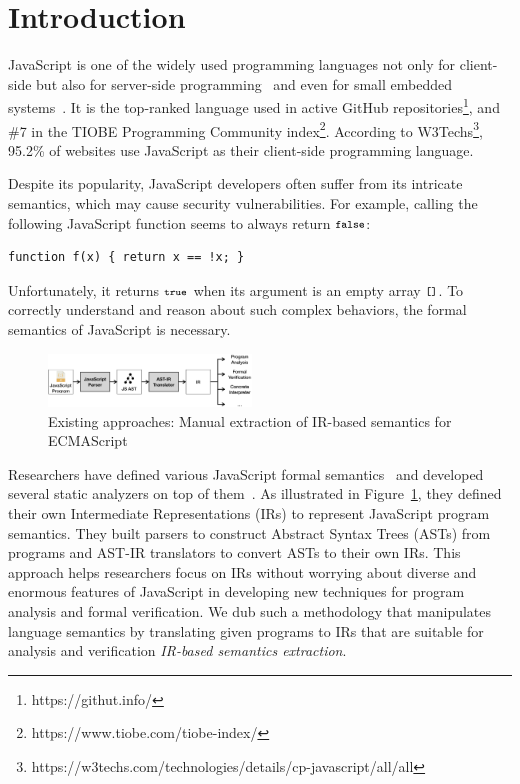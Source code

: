 \section{Introduction}
JavaScript is one of the widely used programming languages not only for client-side
but also for server-side programming~\cite{nodejs, meanjs}
and even for small embedded systems~\cite{espruino, tessel2}.
It is the top-ranked language used in active GitHub
repositories\footnote{https://githut.info/}, and \#7 in the TIOBE
Programming Community index\footnote{https://www.tiobe.com/tiobe-index/}.
According to W3Techs\footnote{https://w3techs.com/technologies/details/cp-javascript/all/all},
95.2\% of websites use JavaScript as their client-side programming language.

Despite its popularity, JavaScript developers often suffer from its intricate semantics,
which may cause security vulnerabilities.  For example, calling the following JavaScript
function seems to always return \( \texttt{\footnotesize false} \):
\begin{lstlisting}[style=myJSstyle]
    function f(x) { return x == !x; }
\end{lstlisting}
Unfortunately, it returns \( \texttt{\footnotesize true} \) when its argument is an empty array
\( \texttt{\footnotesize[]} \).  To correctly understand and reason about such complex
behaviors, the formal semantics of JavaScript is necessary.

\begin{figure}
  \centering
  \includegraphics[width=0.48\textwidth]{img/existing.png}
\vspace*{-2em}
  \caption{Existing approaches: Manual extraction of IR-based semantics for ECMAScript}
  \label{fig:existing}
\vspace*{-1em}
\end{figure}

Researchers have defined various JavaScript formal
semantics~\cite{aplas08,lambdajs,kjs,javert} and developed several static
analyzers on top of them~\cite{jsai,tajs,wala,safe}.  As illustrated
in Figure~\ref{fig:existing}, they defined their own Intermediate
Representations (IRs) to represent JavaScript program semantics.  They
built parsers to construct Abstract Syntax Trees (ASTs) from
programs and AST-IR translators to convert ASTs
to their own IRs.  This approach helps researchers focus on IRs
without worrying about diverse and enormous features of JavaScript in
developing new techniques for program analysis and formal verification.
We dub such a methodology that manipulates language semantics by
translating given programs to IRs that are suitable for analysis and
verification \textit{IR-based semantics extraction}.

